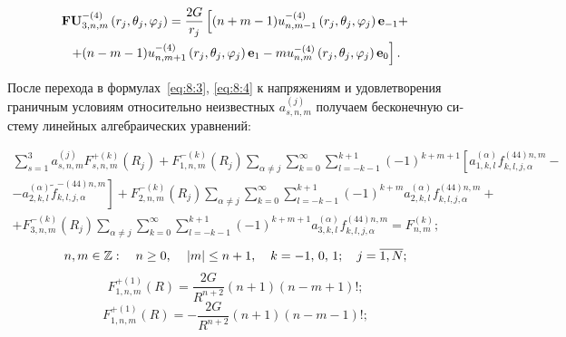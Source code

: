 \begin{russian}
\begin{multline}
{\bf{FU}}_{3,n,m}^{ - (4)}\left( {{r_j},{\theta _j},{\varphi _j}} \right) = \frac{{2G}}{{{r_j}}}\left[ {(n + m - 1)u_{n,m - 1}^{ - (4)}\left( {{r_j},{\theta _j},{\varphi _j}} \right){{\bf{e}}_{ - 1}} + } \right.\\
\left. { + (n - m - 1)u_{n,m + 1}^{ - (4)}\left( {{r_j},{\theta _j},{\varphi _j}} \right){{\bf{e}}_1} - mu_{n,m}^{ - (4)}\left( {{r_j},{\theta _j},{\varphi _j}} \right){{\bf{e}}_0}} \right].
\label{eq:8:f6}
\end{multline}

После перехода в формулах~\eqref{eq:8:3}, \eqref{eq:8:4} к напряжениям и удовлетворения граничным условиям относительно неизвестных $a_{s,n,m}^{(j)}$ получаем бесконечную систему линейных алгебраических уравнений:

\begin{multline}
\sum\limits_{s = 1}^3 {a_{s,n,m}^{(j)}} F_{s,n,m}^{ + (k)}({R_j}) + F_{1,n,m}^{ - (k)}({R_j})\sum\limits_{\alpha  \ne j} {\sum\limits_{k = 0}^\infty  {\sum\limits_{l =  - k - 1}^{k + 1} {{{( - 1)}^{k + m + 1}}} } \left[ {a_{1,k,l}^{(\alpha )}f_{k,l,j,\alpha }^{(44)n,m} - } \right.} \\
\left. { - a_{2,k,l}^{(\alpha )}\tilde f_{k,l,j,\alpha }^{ - (44)n,m}} \right] + F_{2,n,m}^{ - (k)}({R_j})\sum\limits_{\alpha  \ne j} {\sum\limits_{k = 0}^\infty  {\sum\limits_{l =  - k - 1}^{k + 1} {{{( - 1)}^{k + m}}} } a_{2,k,l}^{(\alpha )}f_{k,l,j,\alpha }^{(44)n,m} + } \\
+ F_{3,n,m}^{ - (k)}({R_j})\sum\limits_{\alpha  \ne j} \sum\limits_{k = 0}^\infty  {\sum\limits_{l =  - k - 1}^{k + 1} {{{( - 1)}^{k + m + 1}}} } a_{3,k,l}^{(\alpha )}f_{k,l,j,\alpha }^{(44)n,m} = F_{n,m}^{(k)};
\label{eq:8:sys}
\end{multline}
$$
n,m \in\mathbb{Z}:\quad n \ge 0,{\mkern 1mu} \quad {\kern 1pt} |m| \le n + 1,\quad {\mkern 1mu} k =  - 1,{\mkern 1mu} {\kern 1pt} 0,{\mkern 1mu} {\kern 1pt} 1;\;\;\;{\mkern 1mu} {\kern 1pt} j = \overline {1,N};
$$
\begin{equation}
F_{1,n,m}^{ + (1)}(R) = \frac{{2G}}{{{R^{n + 2}}}}(n + 1)(n - m + 1)!;
\label{eq:8:12}
\end{equation}
\begin{equation}
F_{1,n,m}^{ + (1)}(R) =  - \frac{{2G}}{{{R^{n + 2}}}}(n + 1)(n - m - 1)!;
\label{eq:8:12a}
\end{equation}


\end{russian}
